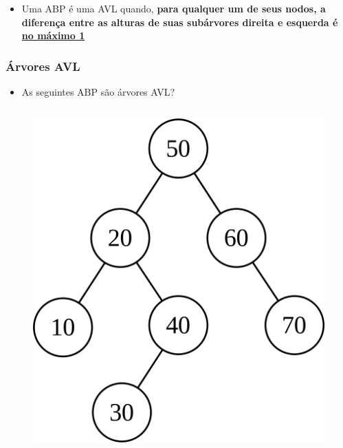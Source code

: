 \documentclass[aspectratio=169]{beamer}
\begin{document}
\begin{frame}
\begin{itemize}
\begin{columns}[T]
\begin{column}{0.5\linewidth}
\begin{figure}[h]
	\tiny{Evgenii Mikhailovich Landis (1921-1997)}
\end{figure}
\end{column}
\end{columns}
~\\
	\item Uma ABP é uma AVL quando, \textbf{para qualquer um de seus nodos, a diferença entre as alturas de suas subárvores direita e esquerda é \underline{no máximo 1}}
\end{itemize}
\end{frame}

\begin{frame}\frametitle{Árvores AVL}
\begin{itemize}
	\item As seguintes ABP são árvores AVL?
\end{itemize}
\vspace{-3mm}
\begin{columns}[T]
\begin{column}{0.5\linewidth}
\begin{figure}[h]
	\centering
	\includegraphics[height=0.5\paperheight]{imagens/avl07.png}\\~

\end{figure}
\end{column}
\end{columns}
\end{frame}
\end{document}
